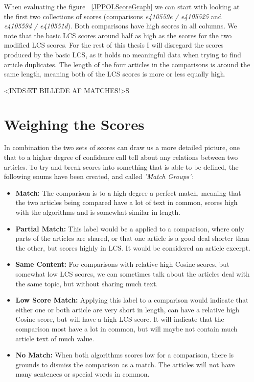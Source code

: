 When evaluating the figure ~\ref{JPPOLScoreGraph} we can start with looking at the first two collections of scores (comparisons \textit{e410559e / e4105525} and \textit{e410559d / e410551d}). Both comparisons have high scores in all columns. We note that the basic LCS scores around half as high as the scores for the two modified LCS scores. For the rest of this thesis I will disregard the scores produced by the basic LCS, as it holds no meaningful data when trying to find article duplicates. The length of the four articles in the comparisons is around the same length, meaning both of the LCS scores is more or less equally high.

<INDSÆT BILLEDE AF MATCHES!>S

\section{Weighing the Scores}

In combination the two sets of scores can draw us a more detailed picture, one that to a higher degree of confidence call tell about any relations between two articles. To try and break scores into something that is able to be defined, the following enums have been created, and called \textit{'Match Groups'}:

\begin{itemize}
\item \textbf{Match:} The comparison is to a high degree a perfect match, meaning that the two articles being compared have a lot of text in common, scores high with the algorithms and is somewhat similar in length.
\item \textbf{Partial Match:} This label would be a applied to a comparison, where only parts of the articles are shared, or that one article is a good deal shorter than the other, but scores highly in LCS. It would be considered an article excerpt.
\item \textbf{Same Content:} For comparisons with relative high Cosine scores, but somewhat low LCS scores, we can sometimes talk about the articles deal with the same topic, but without sharing much text. 
\item \textbf{Low Score Match:} Applying this label to a comparison would indicate that either one or both article are very short in length, can have a relative high Cosine score, but will have a high LCS score. It will indicate that the comparison most have a lot in common, but will maybe not contain much article text of much value.
\item \textbf{No Match:} When both algorithms scores low for a comparison, there is grounds to dismiss the comparison as a match. The articles will not have many sentences or special words in common.
\end{itemize}

